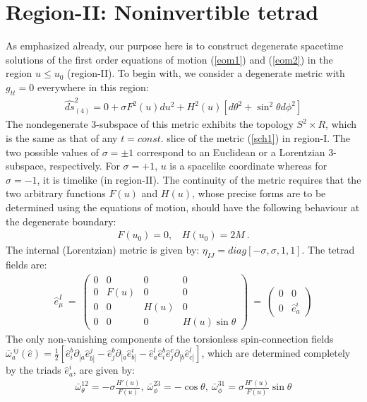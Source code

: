 \documentclass[preprint,aps,superscriptaddress,nofootinbib]{revtex4-1}
\newcommand{\del}{\partial}
\begin{document}
\section{Region-II: Noninvertible tetrad}
As emphasized already, our purpose here is to construct degenerate 
spacetime solutions of the first order equations of motion (\ref{eom1}) 
and (\ref{eom2}) in the region  $u\leq u_0$ (region-II). 
To begin with, we consider a degenerate metric with $g_{tt}=0$ 
everywhere in this region:
\begin{eqnarray}\label{metric2}
\hat{ds}^2_{(4)}=0+ \sigma F^2(u) du^2 + H^2(u)\left[d\theta^2+\sin^2 
\theta d\phi^2\right]
\end{eqnarray}
The nondegenerate 3-subspace of this metric exhibits the topology 
$S^2\times R$, which is the same as that of any $t=const.$ slice of the 
metric (\ref{sch1}) in region-I. 
The two possible values of $\sigma=\pm 1$ correspond to an Euclidean or 
a Lorentzian 3-subspace,  respectively. For $\sigma=+1$, $u$ is a 
spacelike coordinate whereas for $\sigma=-1$, it is timelike (in 
region-II). The continuity of the metric requires that the two arbitrary 
functions $F(u)$ and $H(u)$, whose precise forms are to be determined 
using the equations of motion, should have the following behaviour at 
the degenerate boundary:
\begin{eqnarray}
F(u_0)=0,~~~~H(u_0)=2M~.
\end{eqnarray}
The internal (Lorentzian) metric is given by: $\eta_{IJ}=diag[-\sigma,
\sigma,1,1]$. 
 The tetrad fields are:
 \begin{eqnarray}\label{e}
\hat{e}^I_\mu~=~\left(\begin{array}{cccc}
0 & 0 & 0 & 0\\
0 & F(u) & 0 & 0\\
0 & 0 & H(u) & 0\\
0 & 0 & 0 & H(u)\sin\theta \end{array}\right) ~=~ \left(\begin{array}{cc}
0 & 0 \\
0 & \hat{e}_a^i\end{array}\right)
\end{eqnarray}
 The only non-vanishing components of the torsionless spin-connection 
fields 
$\bar{\omega}_a^{~ij}(\hat{e})={\frac{1}{ 2}} \left[ \hat{e}^b_i 
\del^{}_{[a}\hat{e}_{b]}^j-\hat{e}^b_j\del^{}_{[a}\hat{e}_{b]}^i -  
\hat{e}_a^l \hat{e}^b_i\hat{e}^c_j\del^{}_{[b}\hat{e}_{c]}^l \right]$, 
which are determined completely by the triads $\hat{e}_a^i$, are 
given by:
\begin{eqnarray}\label{R3}
\bar{\omega}_\theta^{12}=-\sigma\frac{H'(u)}
{F(u)},~\bar{\omega}_\phi^{23}=-\cos\theta,~\bar{\omega}_\phi^{31}
=\sigma\frac{H'(u)}{F(u)}\sin\theta
\end{eqnarray}
\end{document}
